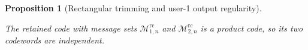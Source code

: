 \documentclass[11pt,onecolumn]{IEEEtran}
\newcommand{\calM}{\mathcal{M}}
\newcommand{\calN}{\mathcal{N}}
\newcommand{\rvC}{\mathsf{C}}
\newtheorem{proposition}[theorem]{Proposition}
\newcommand{\rc}{\mathrm{rc}}
\begin{document}
\begin{proposition}[Rectangular trimming and user-1 output regularity]
\begin{itemize}
\end{itemize}
The retained code with message sets $\calM_{1,n}^{\rc}$ and $\calM_{2,n}^{\rc}$  is a product code, so its two  codewords are independent.
\end{proposition}

%
%
%   
\end{document}
